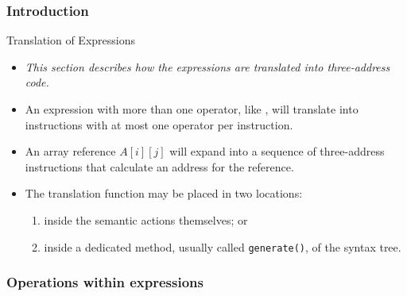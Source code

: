 \begin{bibunit}[apalike]
\subsubsection{Introduction}

\tableofcontentslide[sections={3-6},sectionstyle={show/shaded},subsectionstyle={show/shaded/hide},subsubsectionstyle={show/show/hide/hide}]

\begin{frame}{Translation of Expressions}
	\begin{itemize}
	\item \emph{This section describes how the expressions are translated into three-address code.}
	\vfill
	\item An expression with more than one operator, like , will translate into instructions with at most one operator per instruction.
	\item An array reference $A[i][j]$ will expand into a sequence of three-address instructions that calculate an address for the reference.
	\vfill
	\item The translation function may be placed in two locations:
		\begin{enumerate}
		\item inside the semantic actions themselves; or
		\item inside a dedicated method, usually called \texttt{generate()}, of the syntax tree.
		\end{enumerate}
	\end{itemize}
\end{frame}

\subsubsection{Operations within expressions}

\tableofcontentslide[sections={3-6},sectionstyle={show/shaded},subsectionstyle={show/shaded/hide},subsubsectionstyle={show/shaded/hide/hide}]


\end{bibunit}
